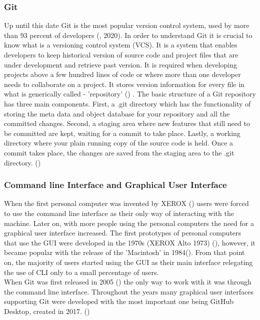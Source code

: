 \documentclass[]{report}
\begin{document}
	\subsubsection{Git}
	Up until this date Git is the most popular version control system, used by more than 93 percent of developers (\cite{stackoverflow_stack_nodate}, 2020). In order to understand Git it is crucial to know what is a versioning control system (VCS). It is a system that enables developers to keep historical version of source code and project files that are under development and retrieve past version. It is required when developing projects above a few hundred lines of code or where more than one developer needs to collaborate on a project. It stores version information for every file in what is generically called - 'repository' (\cite{ruparelia_history_2010}) . The basic structure of a Git repository has three main components. First, a .git directory which has the functionality of storing the meta data and object database for your repository and all the committed changes. Second, a staging area where new features that still need to be committed are kept, waiting for a commit to take place. Lastly, a working directory where your plain running copy of the source code is held. Once a commit takes place, the changes are saved from the staging area to the .git directory. (\cite{hultstrand_git_2015})
	
	\subsubsection{Command line Interface and Graphical User Interface}
	
	When the first personal computer was invented by XEROX (\cite{smith_fumbling_1999}) users were forced to use the command line interface as their only way of interacting with the machine. Later on, with more people using the personal computers the need for a graphical user interface increased. The first prototypes of personal computers that use the GUI were developed in the 1970s (XEROX Alto 1973) (\cite{reimer_history_nodate}), however, it became popular with the release of the 'Macintosh' in  1984(\cite{reimer_history_nodate}). From that point on, the majority of users started using the GUI as their main interface relegating the use of CLI only to a small percentage of users.\\When Git was first released in 2005 (\cite{scott_chacon_and_ben_straub_git_nodate}) the only way to work with it was through the command line interface. Throughout the years many graphical user interfaces supporting Git were developed with the most important one being GitHub Desktop, created in 2017. (\cite{forster_announcing_2017})
	
\end{document}
